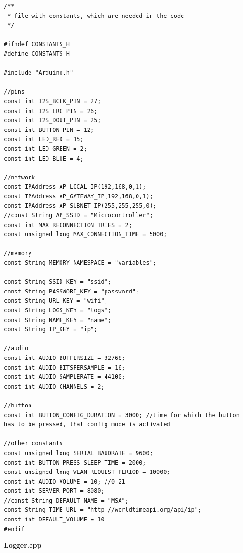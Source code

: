 \documentclass[11pt, twoside]{article}
\begin{document}
\begin{lstlisting}
/**
 * file with constants, which are needed in the code
 */

#ifndef CONSTANTS_H
#define CONSTANTS_H

#include "Arduino.h"

//pins
const int I2S_BCLK_PIN = 27;
const int I2S_LRC_PIN = 26;
const int I2S_DOUT_PIN = 25;
const int BUTTON_PIN = 12;
const int LED_RED = 15;
const int LED_GREEN = 2;
const int LED_BLUE = 4;

//network
const IPAddress AP_LOCAL_IP(192,168,0,1);
const IPAddress AP_GATEWAY_IP(192,168,0,1);
const IPAddress AP_SUBNET_IP(255,255,255,0);
//const String AP_SSID = "Microcontroller";
const int MAX_RECONNECTION_TRIES = 2;
const unsigned long MAX_CONNECTION_TIME = 5000;

//memory
const String MEMORY_NAMESPACE = "variables";

const String SSID_KEY = "ssid";
const String PASSWORD_KEY = "password";
const String URL_KEY = "wifi";
const String LOGS_KEY = "logs";
const String NAME_KEY = "name";
const String IP_KEY = "ip";

//audio
const int AUDIO_BUFFERSIZE = 32768;
const int AUDIO_BITSPERSAMPLE = 16;
const int AUDIO_SAMPLERATE = 44100;
const int AUDIO_CHANNELS = 2;

//button
const int BUTTON_CONFIG_DURATION = 3000; //time for which the button has to be pressed, that config mode is activated

//other constants
const unsigned long SERIAL_BAUDRATE = 9600;
const int BUTTON_PRESS_SLEEP_TIME = 2000;
const unsigned long WLAN_REQUEST_PERIOD = 10000;
const int AUDIO_VOLUME = 10; //0-21
const int SERVER_PORT = 8080;
//const String DEFAULT_NAME = "MSA";
const String TIME_URL = "http://worldtimeapi.org/api/ip";
const int DEFAULT_VOLUME = 10;
#endif\end{lstlisting}

\textbf{Logger.cpp}
\end{document}
